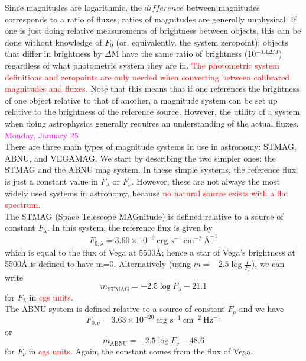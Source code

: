 \documentclass[12pt]{article}
\begin{document}
Since magnitudes are logarithmic, the $difference$ between
magnitudes corresponds to a ratio of fluxes; ratios of magnitudes are
generally unphysical. If one is just doing relative measurements of
brightness between objects, this can be done without knowledge of $F_0$
(or, equivalently, the system zeropoint); objects that differ in brightness
by $\Delta$M have the same ratio of brightness (10$^{-0.4 \Delta M}$)
regardless of what photometric system they are in.
\textcolor{red}{The photometric system
definitions and zeropoints are only needed when converting between calibrated
magnitudes and fluxes}. Note that this means that if one references the
brightness of one object relative to that of another, a magnitude system
can be set up relative to the brightness of the reference source. However, the
utility of a system when doing astrophysics generally requires an
understanding of the actual fluxes.\\

\noindent \textcolor{magenta}{Monday, January 25}\\

\noindent There are three main types of magnitude systems in use in astronomy:
STMAG, ABNU, and VEGAMAG.
We start by describing the two simpler ones: the STMAG and the ABNU mag system.
In these simple systems, the reference flux is just a constant value in
$F_{\lambda}$ or $F_{\nu}$. However, these are not always the most widely used
systems in astronomy, because
\textcolor{red}{no natural source exists with a flat spectrum}.\\

\noindent The STMAG (Space Telescope MAGnitude) is defined
relative to a source of constant $F_{\lambda}$. In this system,
the reference flux is given by
\begin{equation*}
    F_{0,\lambda} = 3.60 \times 10^{-9}\ \textrm{erg\ s}^{-1}\
    \textrm{cm}^{-2}\ \textrm{\AA{}}^{-1}
\end{equation*}
which is equal to the flux of Vega at 5500\AA{};
hence a star of Vega's brightness at 5500\AA{} is defined to have m=0.
Alternatively (using $m = -2.5\log \frac{F}{F_0}$), we can write
\begin{equation*}
    m_{\textrm{STMAG}} = -2.5 \log F_{\lambda} - 21.1
\end{equation*}
for $F_{\lambda}$ in \textcolor{red}{cgs units}.\\

\noindent The ABNU system is defined relative to a source
of constant $F_{\nu}$ and we have
\begin{equation*}
    F_{0,\nu} = 3.63 \times 10^{-20}\ \textrm{erg\ s}^{-1}\
    \textrm{cm}^{-2}\ \textrm{Hz}^{-1}
\end{equation*}
or
\begin{equation*}
    m_{\textrm{ABNU}} = -2.5 \log F_{\nu} - 48.6
\end{equation*}
for $F_{\nu}$ in \textcolor{red}{cgs units}.
Again, the constant comes from the flux of Vega.\\
\end{document}
